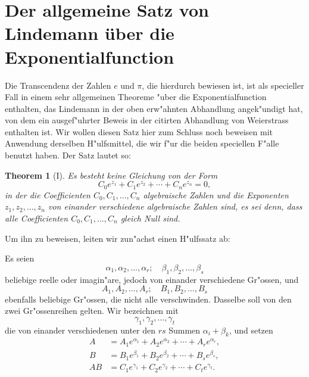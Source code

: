\documentclass[10pt,a4paper]{article}
\theoremstyle{weberstyle}
\newtheorem{theorem}{Theorem}[section]
\begin{document}
\newpage

%
%
\section[Allgemeiner Satz über die Exponentialfunction]%
{Der allgemeine Satz von Lindemann \"uber die\\Exponentialfunction}%
\label{sec:207}

Die Transcendenz der Zahlen $e$ und $\pi$, die hierdurch bewiesen ist,
ist als specieller Fall in einem sehr allgemeinen Theoreme "uber die
Exponentialfunction enthalten, das Lindemann in der oben erw"ahnten
Abhandlung angek"undigt hat, von dem ein ausgef"uhrter Beweis in der
citirten Abhandlung von Weierstrass enthalten ist. Wir wollen diesen
Satz hier zum Schluss noch beweisen mit Anwendung derselben
H"ulfsmittel, die wir f"ur die beiden speciellen F"alle benutzt haben.
Der Satz lautet so:

\begin{theorem}[I]
Es besteht keine Gleichung von der Form
\begin{equation}\label{eq:207.1}
C_0e^{z_1} + C_1e^{z_2} + \cdots + C_ne^{z_n} = 0,
\end{equation}
in der die Coefficienten $C_0,C_1,\dots,C_n$ algebraische Zahlen und die
Exponenten $z_1,z_2,\dots,z_n$ von einander verschiedene algebraische
Zahlen sind, es sei denn, dass alle Coefficienten
$C_0,C_1,\dots,C_n$ gleich Null sind.
\end{theorem}

Um ihn zu beweisen, leiten wir zun"achst einen H"ulfssatz ab:

Es seien
\[
\alpha_1,\alpha_2,\dots,\alpha_r;\quad \beta_1,\beta_2,\dots,\beta_s
\]
beliebige reelle oder imagin"are, jedoch von einander verschiedene
Gr"ossen, und
\[
A_1,A_2,\dots,A_r;\quad B_1,B_2,\dots,B_s
\]
ebenfalls beliebige Gr"ossen, die nicht alle verschwinden. Dasselbe soll
von den zwei Gr"ossenreihen gelten. Wir bezeichnen mit
\[
\gamma_1,\gamma_2,\dots,\gamma_t
\]
die von einander verschiedenen unter den $rs$ Summen $\alpha_i+\beta_k$, und
setzen
\begin{align}
A &= A_1e^{\alpha_1} + A_2e^{\alpha_2} + \cdots + A_re^{\alpha_r},\label{eq:207.2}\\
B &= B_1e^{\beta_1} + B_2e^{\beta_2} + \cdots + B_se^{\beta_s},\label{eq:207.3}\\
AB &= C_1e^{\gamma_1} + C_2e^{\gamma_2} + \cdots + C_te^{\gamma_t}.\label{eq:207.4}
\end{align}
\end{document}
